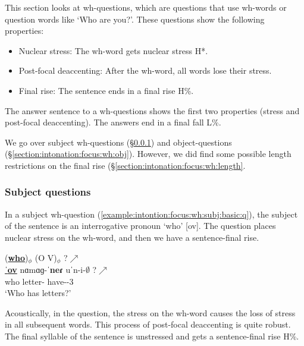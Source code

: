 This section looks at wh-questions, which are questions that use wh-words or question words like `Who are you?'. These questions show the following properties: 
\begin{itemize}[noitemsep,topsep=0pt]
	\item Nuclear stress: The wh-word gets nuclear stress H*. 
	\item Post-focal deaccenting: After the wh-word, all words lose their stress. 
	\item Final rise: The sentence ends in a final rise H\%.
\end{itemize}

The answer sentence to a wh-questions shows the first two properties (stress and post-focal deaccenting). The answers end in a final fall L\%. 

We go over subject wh-questions (\S\ref{section:intonation:focus:wh:subj}) and object-questions (\S\ref{section:intonation:focus:wh:obj}). However, we did find some possible length restrictions on the final rise (\S\ref{section:intonation:focus:wh:length}. 

\subsubsection{Subject questions   }\label{section:intonation:focus:wh:subj}

In  a subject wh-question (\ref{example:intontion:focus:wh:subj:basic:q}), the subject of the sentence is an interrogative pronoun `who' [ov]. The question places nuclear stress on the wh-word, and then we have  a sentence-final rise. 

\begin{exe}
	
	\ex \glll(\underline{\textbf{who}})$_\phi$ ({O} V)$_\phi$ ?$\nearrow$ \\
	\underline{ˈ\textbf{ov}} nɑmɑɡ-ˈ\textbf{neɾ} uˈn-i-$\emptyset$ ?$\nearrow$ \\
	who letter-{\pl} have-{\thgloss}-3{\sg} \\
	\trans `Who has letters?' 
	\label{example:intontion:focus:wh:subj:basic:q}
	\\ 
\end{exe}

Acoustically, in the question, the stress on the wh-word causes the loss of stress in all subsequent words. This process of post-focal deaccenting is quite robust. The final syllable of the sentence is unstressed and gets a sentence-final rise H\%.  

